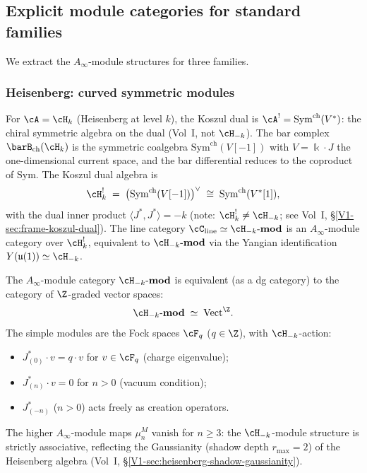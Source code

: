 \subsection{Explicit module categories for standard families}

We extract the $A_\infty$-module structures for three
families.

\subsubsection{Heisenberg: curved symmetric modules}

For $\cA=\cH_k$ (Heisenberg at level $k$),
the Koszul dual is $\cA^!=\mathrm{Sym}^{\mathrm{ch}}(V^*)$:
the chiral symmetric algebra on the dual (Vol~I, not $\cH_{-k}$). The bar complex
$\barB_{\mathrm{ch}}(\cH_k)$ is the symmetric coalgebra
$\mathrm{Sym}^{\mathrm{ch}}(V[-1])$ with $V=\Bbbk\cdot J$
the one-dimensional current space, and the bar differential
reduces to the coproduct of $\mathrm{Sym}$. The Koszul
dual algebra is
\[
\cH_k^!
\;=\;
\bigl(\mathrm{Sym}^{\mathrm{ch}}(V[-1])\bigr)^\vee
\;\cong\;
\mathrm{Sym}^{\mathrm{ch}}(V^*[1]),
\]
with the dual inner product $\langle J^*,J^*\rangle=-k$
(note: $\cH_k^! \neq \cH_{-k}$; see Vol~I, \S\ref{V1-sec:frame-koszul-dual}).
The line category $\cC_{\mathrm{line}} \simeq \cH_{-k}\text{-}\mathbf{mod}$
is an $A_\infty$-module category over $\cH_k^!$,
equivalent to $\cH_{-k}\text{-}\mathbf{mod}$
via the Yangian identification $Y(\mathfrak{u}(1)) \simeq \cH_{-k}$.

\begin{proposition}
The $A_\infty$-module category
$\cH_{-k}\text{-}\mathbf{mod}$ is equivalent (as a
dg category) to the category of $\Z$-graded vector spaces:
\begin{equation}
\cH_{-k}\text{-}\mathbf{mod}
\;\simeq\;
\mathrm{Vect}^\Z.
\end{equation}
The simple modules are the Fock spaces
$\cF_q$ ($q\in\Z$), with $\cH_{-k}$-action:
\begin{itemize}
\item $J^*_{(0)}\cdot v=q\cdot v$ for $v\in\cF_q$
 (charge eigenvalue);
\item $J^*_{(n)}\cdot v=0$ for $n>0$ (vacuum condition);
\item $J^*_{(-n)}$ ($n>0$) acts freely as creation operators.
\end{itemize}
The higher $A_\infty$-module maps $\mu_n^M$ vanish
for $n\ge 3$: the $\cH_{-k}$-module structure is
strictly associative, reflecting the Gaussianity
(shadow depth $r_{\max}=2$) of the Heisenberg algebra
(Vol~I, \S\ref*{V1-sec:heisenberg-shadow-gaussianity}).
\end{proposition}

